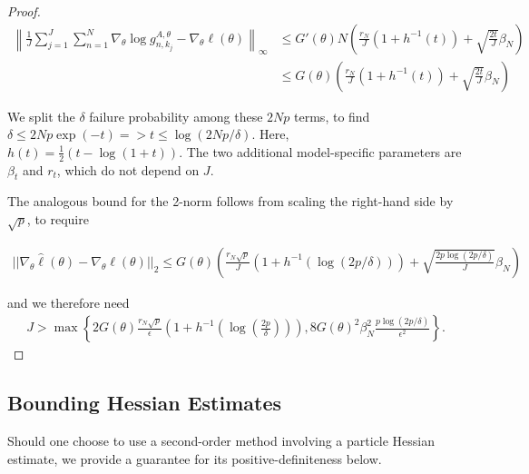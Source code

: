 \documentclass{article}
\begin{document}
\begin{proof}
\begin{align}
    \left\lVert\frac{1}{J}\sum_{j=1}^J\sum_{n=1}^N\nabla_\theta \log g_{n,k_j}^{A,\theta} - \nabla_\theta \ell(\theta) \right\rVert_{\infty} 
    &\leq G'(\theta)N\left(\frac{r_N}{J}(1+h^{-1}(t)) + \sqrt{\frac{2t}{J}}\beta_N \right)\\
    &\leq G(\theta)\left(\frac{r_N}{J}(1+h^{-1}(t)) + \sqrt{\frac{2t}{J}}\beta_N \right)
\end{align}


We split the $\delta$ failure probability among these $2Np$ terms, to find $\delta\leq2Np\exp(-t) => t\leq\log(2Np/\delta)$. Here, $h(t) = \frac{1}{2}(t - \log(1+t))$. The two additional model-specific parameters are $\beta_t$ and $r_t$, which do not depend on $J$. 

The analogous bound for the 2-norm follows from scaling the right-hand side by $\sqrt{p}$, to require 

\begin{align}
    ||\nabla_\theta \hat\ell(\theta) - \nabla_\theta \ell(\theta)||_2 \leq G(\theta)\left(\frac{r_N\sqrt{p}}{J}(1+h^{-1}(\log(2p/\delta))) + \sqrt{\frac{2p\log(2p/\delta)}{J}}\beta_N\right)
\end{align}

and we therefore need 
\begin{align}
    J > \max\left\{2G(\theta)\frac{r_N\sqrt{p}}{\epsilon}\left(1+h^{-1}\left(\log\left(\frac{2p}{\delta}\right)\right)\right), 8G(\theta)^2\beta_N^2\frac{p\log(2p/\delta)}{\epsilon^2}\right\}.
\end{align}

\end{proof}


\subsection{Bounding Hessian Estimates}

Should one choose to use a second-order method involving a particle Hessian estimate, we provide a guarantee for its positive-definiteness below.
\end{document}
